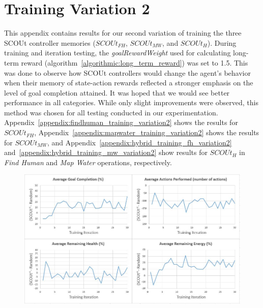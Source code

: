 \pagebreak
\tocless\section{Training Variation 2} \label{sec:training_variation2}
This appendix contains results for our second variation of training the three SCOUt controller memories ($SCOUt_{FH}$, $SCOUt_{MW}$, and $SCOUt_{H}$).
During training and iteration testing, the \textit{goalRewardWeight} used for calculating long-term reward (algorithm~\ref{algorithmic:long_term_reward}) was set to 1.5.
This was done to observe how SCOUt controllers would change the agent's behavior when their memory of state-action rewards reflected a stronger emphasis on the level of goal completion attained.
It was hoped that we would see better performance in all categories.
While only slight improvements were observed, this method was chosen for all testing conducted in our experimentation.
Appendix~\ref{appendix:findhuman_training_variation2} shows the results for $SCOUt_{FH}$, Appendix~\ref{appendix:mapwater_training_variation2} shows the results for $SCOUt_{MW}$, and Appendix~\ref{appendix:hybrid_training_fh_variation2} and~\ref{appendix:hybrid_training_mw_variation2} show results for $SCOUt_{H}$ in \textit{Find Human} and \textit{Map Water} operations, respectively.

\begin{appxfig}[H]
\begin{figure}[H]
  \includegraphics[width=0.9\columnwidth]{Figures/Results/TrainingVariation2/FindHuman.JPG}
\end{figure}
\caption{Iteration testing performance results for $SCOUt_{FH}$ attempting \textit{Find Human} using setup variation 2 (see subsection~\ref{subsec:training_variations}). All graphs show the controller's average difference in performance compared to $Random$ ($SCOUt_{FH}$ average - $Random$ average) VS the number of training iterations completed.}
\label{appendix:findhuman_training_variation2}
\end{appxfig}


